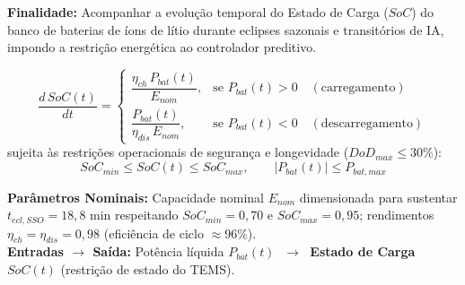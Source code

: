 \documentclass[11pt,a4paper]{article}
\begin{document}
\begin{tcolorbox}[colback=boxbg, colframe=bordergreen, title=\color{ifesdark}\textbf{MODELO 3: DINÂMICA MACRO DO ARMAZENAMENTO ELETROQUÍMICO (BESS)}]
\small
\textbf{Finalidade:} Acompanhar a evolução temporal do Estado de Carga ($SoC$) do banco de baterias de íons de lítio durante eclipses sazonais e transitórios de IA, impondo a restrição energética ao controlador preditivo.

\vspace{-4pt}
\begin{equation}
    \frac{d\,SoC(t)}{dt} =
    \begin{cases}
        \dfrac{\eta_{ch} \, P_{bat}(t)}{E_{nom}}, & \text{se } P_{bat}(t) > 0 \quad (\text{carregamento}) \\[10pt]
        \dfrac{P_{bat}(t)}{\eta_{dis} \, E_{nom}}, & \text{se } P_{bat}(t) < 0 \quad (\text{descarregamento})
    \end{cases}
    \label{eq:soc_dinamica}
\end{equation}
sujeita às restrições operacionais de segurança e longevidade ($DoD_{max} \le 30\%$):
\begin{equation}
    SoC_{min} \le SoC(t) \le SoC_{max}, \qquad \big|P_{bat}(t)\big| \le P_{bat,max}
    \label{eq:soc_restricoes}
\end{equation}

\vspace{2pt}
\noindent\textbf{Parâmetros Nominais:} Capacidade nominal $E_{nom}$ dimensionada para sustentar $t_{ecl,SSO} = 18{,}8\text{ min}$ respeitando $SoC_{min} = 0{,}70$ e $SoC_{max} = 0{,}95$; rendimentos $\eta_{ch} = \eta_{dis} = 0{,}98$ (eficiência de ciclo $\approx 96\%$).\\
\textbf{Entradas $\to$ Saída:} Potência líquida $P_{bat}(t)$ $\;\longrightarrow\;$ \textbf{Estado de Carga $SoC(t)$} (restrição de estado do TEMS).
\end{tcolorbox}

\vspace{4pt}
\end{document}
